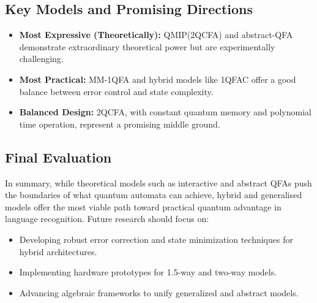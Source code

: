 \subsection{Key Models and Promising Directions}
\begin{itemize}
    \item \textbf{Most Expressive (Theoretically):} QMIP(2QCFA) and abstract-QFA demonstrate extraordinary theoretical power but are experimentally challenging.
    \item \textbf{Most Practical:} MM-1QFA and hybrid models like 1QFAC offer a good balance between error control and state complexity.
    \item \textbf{Balanced Design:} 2QCFA, with constant quantum memory and polynomial time operation, represent a promising middle ground.
\end{itemize}

\subsection{Final Evaluation}
In summary, while theoretical models such as interactive and abstract QFAs push the boundaries of what quantum automata can achieve, hybrid and generalised models offer the most viable path toward practical quantum advantage in language recognition. Future research should focus on:
\begin{itemize}
    \item Developing robust error correction and state minimization techniques for hybrid architectures.
    \item Implementing hardware prototypes for 1.5-way and two-way models.
    \item Advancing algebraic frameworks to unify generalized and abstract models.
\end{itemize}

